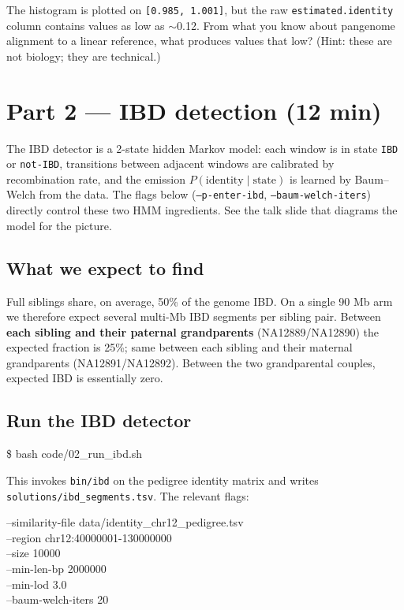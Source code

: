 \documentclass[11pt]{article}
\begin{document}
\begin{quest}[1.3]
The histogram is plotted on \texttt{[0.985, 1.001]}, but the raw
\texttt{estimated.identity} column contains values as low as $\sim$0.12.
From what you know about pangenome alignment to a linear reference,
what produces values that low? (Hint: these are not biology; they are
technical.)
\end{quest}

\section{Part 2 --- IBD detection (12 min)}

\begin{warn}
The IBD detector is a 2-state hidden Markov model: each window is in
state \texttt{IBD} or \texttt{not-IBD}, transitions between adjacent
windows are calibrated by recombination rate, and the emission
$P(\text{identity}\mid\text{state})$ is learned by Baum--Welch from the
data. The flags below (\texttt{--p-enter-ibd},
\texttt{--baum-welch-iters}) directly control these two HMM ingredients.
See the talk slide that diagrams the model for the picture.
\end{warn}

\subsection*{What we expect to find}

Full siblings share, on average, 50\% of the genome IBD. On a single 90 Mb
arm we therefore expect several multi-Mb IBD segments per sibling pair.
Between \textbf{each sibling and their paternal grandparents}
(NA12889/NA12890) the expected fraction is 25\%; same between each
sibling and their maternal grandparents (NA12891/NA12892). Between the
two grandparental couples, expected IBD is essentially zero.

\subsection*{Run the IBD detector}

\begin{cmd}
\$ bash code/02\_run\_ibd.sh
\end{cmd}

This invokes \texttt{bin/ibd} on the pedigree identity matrix and writes
\texttt{solutions/ibd\_segments.tsv}. The relevant flags:

\begin{cmd}
--similarity-file data/identity\_chr12\_pedigree.tsv \\
--region chr12:40000001-130000000 \\
--size 10000 \\
--min-len-bp 2000000 \\
--min-lod 3.0 \\
--baum-welch-iters 20
\end{cmd}
\end{document}
